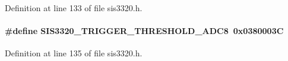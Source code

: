 Definition at line 133 of file sis3320.h.
\paragraph[{SIS3320\_\-TRIGGER\_\-THRESHOLD\_\-ADC8}]{\setlength{\rightskip}{0pt plus 5cm}\#define SIS3320\_\-TRIGGER\_\-THRESHOLD\_\-ADC8~0x0380003C}\hfill\label{sis3320_8h_a37e82b65c1dbaa46e3d8055f26ae0b3b}


Definition at line 135 of file sis3320.h.